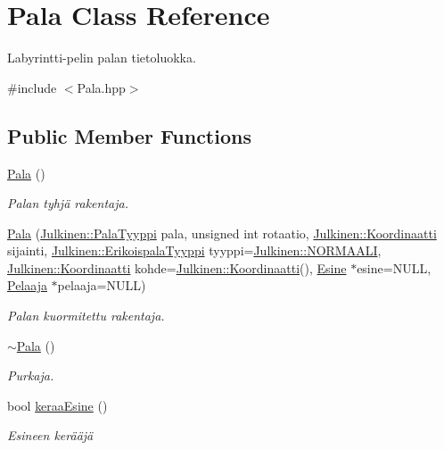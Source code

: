 \hypertarget{class_pala}{}\section{Pala Class Reference}
\label{class_pala}


Labyrintti-\/pelin palan tietoluokka.  




{\ttfamily \#include $<$Pala.\+hpp$>$}

\subsection*{Public Member Functions}
\begin{DoxyCompactItemize}
\item 
\hyperlink{class_pala_abfaef7049b3055dc7e3cc3ae93600dd8}{Pala} ()
\begin{DoxyCompactList}\small\item\em Palan tyhjä rakentaja. \end{DoxyCompactList}\item 
\hyperlink{class_pala_a45737786e7c2e42b097efac224117e4b}{Pala} (\hyperlink{namespace_julkinen_a272c70e0503191a485c8a9cd4281e6f5}{Julkinen\+::\+Pala\+Tyyppi} pala, unsigned int rotaatio, \hyperlink{class_julkinen_1_1_koordinaatti}{Julkinen\+::\+Koordinaatti} sijainti, \hyperlink{namespace_julkinen_afc26052e09d0b2214f749492cc5fff19}{Julkinen\+::\+Erikoispala\+Tyyppi} tyyppi=\hyperlink{namespace_julkinen_afc26052e09d0b2214f749492cc5fff19a67d9c76baa2a4eec4ca132c15bd567b5}{Julkinen\+::\+N\+O\+R\+M\+A\+A\+L\+I}, \hyperlink{class_julkinen_1_1_koordinaatti}{Julkinen\+::\+Koordinaatti} kohde=\hyperlink{class_julkinen_1_1_koordinaatti}{Julkinen\+::\+Koordinaatti}(), \hyperlink{class_esine}{Esine} $\ast$esine=N\+U\+L\+L, \hyperlink{class_pelaaja}{Pelaaja} $\ast$pelaaja=N\+U\+L\+L)
\begin{DoxyCompactList}\small\item\em Palan kuormitettu rakentaja. \end{DoxyCompactList}\item 
\hyperlink{class_pala_a86dec16c2dab10022d7fff922a568545}{$\sim$\+Pala} ()
\begin{DoxyCompactList}\small\item\em Purkaja. \end{DoxyCompactList}\item 
bool \hyperlink{class_pala_a80712cfbb26beb9a995ec78a0cf391b2}{keraa\+Esine} ()
\begin{DoxyCompactList}\small\item\em Esineen kerääjä \end{DoxyCompactList}\end{DoxyCompactItemize}

